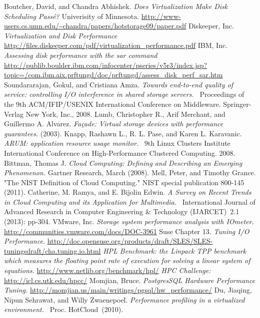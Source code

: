 \begin{thebibliography}{9}
Boutcher, David, and Chandra Abhishek. \emph{Does Virtualization Make Disk Scheduling Passé?}  Univerisity of Minnesota.  \url{http://www-users.cs.umn.edu/~chandra/papers/hotstorage09/paper.pdf}
Diskeeper, Inc.  \emph{Virtualization and Disk Performance}  \url{http://files.diskeeper.com/pdf/virtualization\_performance.pdf}
IBM, Inc. \emph{Assessing disk performance with the sar command}  \url{http://publib.boulder.ibm.com/infocenter/pseries/v5r3/index.jsp?topic=/com.ibm.aix.prftungd/doc/prftungd/assess\_disk\_perf\_sar.htm}
Soundararajan, Gokul, and Cristiana Amza.  \emph{Towards end-to-end quality of service: controlling I/O interference in shared storage servers.}  Proceedings of the 9th ACM/IFIP/USENIX International Conference on Middleware. Springer-Verlag New York, Inc., 2008.
Lumb, Christopher R., Arif Merchant, and Guillermo A. Alvarez.  \emph{Façade: Virtual storage devices with performance guarantees.}  (2003).
Knapp, Rashawn L., R. L. Pase, and Karen L. Karavanic.  \emph{ARUM: application resource usage monitor.}  9th Linux Clusters Institute International Conference on High-Performance Clustered Computing. 2008.
Bittman, Thomas J.  \emph{Cloud Computing:  Defining and Describing an Emerging Phenomenon.}  Gartner Research, March (2008).
Mell, Peter, and Timothy Grance. "The NIST Definition of Cloud Computing." NIST special publication 800-145 (2011).
Catherine, M. Ramya, and E. Bijolin Edwin.  \emph{A Survey on Recent Trends in Cloud Computing and its Application for Multimedia.}  International Journal of Advanced Research in Computer Engineering \& Technology (IJARCET) 2.1 (2013): pp-304.
VMware, Inc. \emph{Storage system performance analysis with IOmeter.}  \url{http://communities.vmware.com/docs/DOC-3961}
Suse Chapter 13.  \emph{Tuning I/O Performance.}  \url{http://doc.opensuse.org/products/draft/SLES/SLES-tuningsdraft/cha.tuning.io.html}
\emph{HPL Benchmark: the Linpack TPP benchmark which measures the floating point rate of execution for solving a linear system of equations.}  \url{http://www.netlib.org/benchmark/hpl/}
\emph{HPC Challenge:}  \url{http://icl.cs.utk.edu/hpcc/}
Momjian, Bruce. \emph{PostgresSQL Hardware Performance Tuning.}  \url{http://momjian.us/main/writings/pgsql/hw\_performance/}
Du, Jiaqing, Nipun Sehrawat, and Willy Zwaenepoel.  \emph{Performance profiling in a virtualized environment.}  Proc. HotCloud (2010).

\end{thebibliography}
